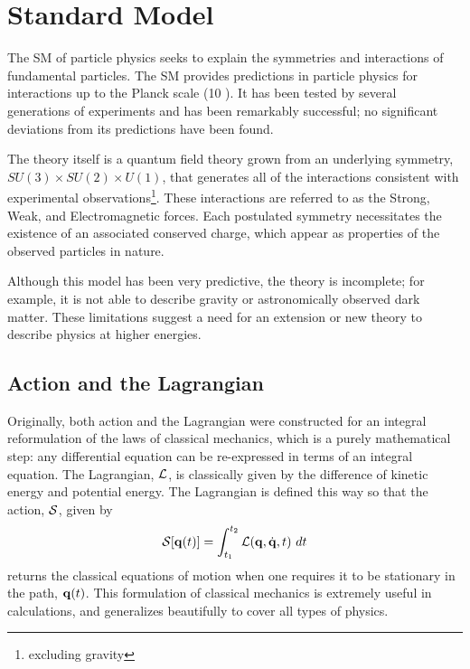 \chapter{Standard Model}

\label{ch:standardmodel}

The \ac{SM} of particle physics seeks to explain the symmetries and interactions of fundamental particles. 
The \ac{SM} provides predictions in particle physics for interactions up to the Planck scale (10 \GeV).
It has been tested by several generations of experiments and has been remarkably successful; no significant deviations from its predictions have been found.

The theory itself is a quantum field theory grown from an underlying symmetry, $SU(3) \times SU(2) \times U(1)$, that generates all of the interactions consistent with experimental observations\footnote{excluding gravity}.
These interactions are referred to as the Strong, Weak, and Electromagnetic forces.
Each postulated symmetry necessitates the existence of an associated conserved charge, which appear as properties of the observed particles in nature. 

Although this model has been very predictive, the theory is incomplete; for example, it is not able to describe gravity or astronomically observed dark matter. 
These limitations suggest a need for an extension or new theory to describe physics at higher energies.

%
\section{Action and the Lagrangian}

Originally, both action and the Lagrangian were constructed for an integral reformulation of the laws of classical mechanics, which is a purely mathematical step: any differential equation can be re-expressed in terms of an integral equation. 
The Lagrangian, $\mathcal{L}$, is classically given by the difference of  kinetic energy and potential energy. 
The Lagrangian is defined this way so that the action, $\mathcal{S}$, given by 
\begin{equation}\label{eq:action}
 \mS[\vect{q}(t)] = \int_{t_1}^{t_2} \mL(\vect{q},\dot{\vect{q}},t)\ dt
\end{equation}
\noindent returns the classical equations of motion when one requires it to be stationary in the path, $\mathbf{q}(t)$. 
This formulation of classical mechanics is extremely useful in calculations, and generalizes beautifully to cover all types of physics.

